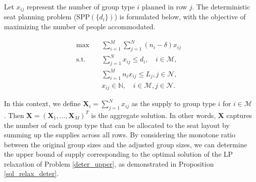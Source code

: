 Let $x_{ij}$ represent the number of group type $i$ planned in row $j$. The deterministic seat planning problem (SPP$(\{d_{i}\})$) is formulated below, with the objective of maximizing the number of people accommodated.

\begin{equation}\label{deter_upper}
    \begin{aligned}
    \max \quad & \sum_{i=1}^{M}  \sum_{j= 1}^{N} (n_i- \delta) x_{ij} \\
    \text {s.t.} \quad & \sum_{j= 1}^{N} x_{ij} \leq d_{i}, \quad i \in \mathcal{M}, \\
    & \sum_{i=1}^{M} n_{i} x_{ij} \leq L_j, j \in \mathcal{N}, \\
    & x_{ij} \in \mathbb{N}, \quad i \in \mathcal{M}, j \in \mathcal{N}.
    \end{aligned}
\end{equation}
  
In this context, we define $\bm{X}_i= \sum_{j=1}^{N} x_{ij}$ as the supply to group type $i$ for $i \in \mathcal{M}$. Then $\bm{X} = (\bm{X}_{1}, \ldots, \bm{X}_{M})^T$ is the aggregate solution. In other words, $\bm{X}$ captures the number of each group type that can be allocated to the seat layout by summing up the supplies across all rows. By considering the monotone ratio between the original group sizes and the adjusted group sizes, we can determine the upper bound of supply corresponding to the optimal solution of the LP relaxation of Problem \eqref{deter_upper}, as demonstrated in Proposition \ref{sol_relax_deter}.





